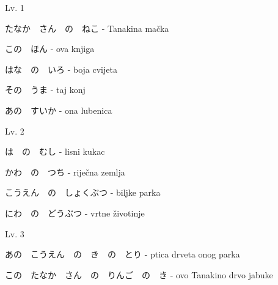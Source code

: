 
\author{Katja Kržišnik, Marko Barbančić}

	
	\begin{mondai}{Lv. 1}
		\item たなか　さん　の　ねこ - Tanakina mačka
		\item この　ほん - ova knjiga
		\item はな　の　いろ - boja cvijeta
		\item その　うま - taj konj
		\item あの　すいか - ona lubenica
	\end{mondai}
	
	\begin{mondai}{Lv. 2}
		\item は　の　むし - lisni kukac
		\item かわ　の　つち - riječna zemlja
		\item こうえん　の　しょくぶつ - biljke parka
		\item にわ　の　どうぶつ - vrtne životinje
	\end{mondai}
	
	\begin{mondai}{Lv. 3}
		\item あの　こうえん　の　き　の　とり - ptica drveta onog parka
		\item この　たなか　さん　の　りんご　の　き - ovo Tanakino drvo jabuke
	\end{mondai}

